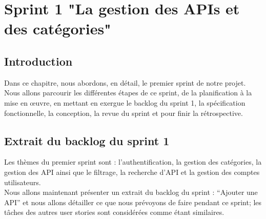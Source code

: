 \chapter{Sprint 1 "La gestion des APIs et des catégories"}

\section*{Introduction}
Dans ce chapitre, nous abordons, en détail, le premier sprint de notre projet. Nous allons parcourir les différentes étapes de ce sprint, de la planification à la mise en œuvre, en mettant en exergue le backlog du sprint 1, la spécification fonctionnelle, la conception, la revue du sprint et pour finir  la rétrospective.

\section{Extrait du backlog du sprint 1}

    Les thèmes du premier sprint sont : l’authentification, la gestion des catégories, la gestion des API ainsi que le filtrage, la recherche d'API et la gestion des comptes utilisateurs. \\
    Nous allons maintenant présenter un extrait du backlog du sprint : “Ajouter une API” et nous allons détailler ce que nous prévoyons de faire pendant ce sprint; les tâches des autres user stories sont considérées comme étant similaires.

    \captionsetup[table]{justification=centering}

